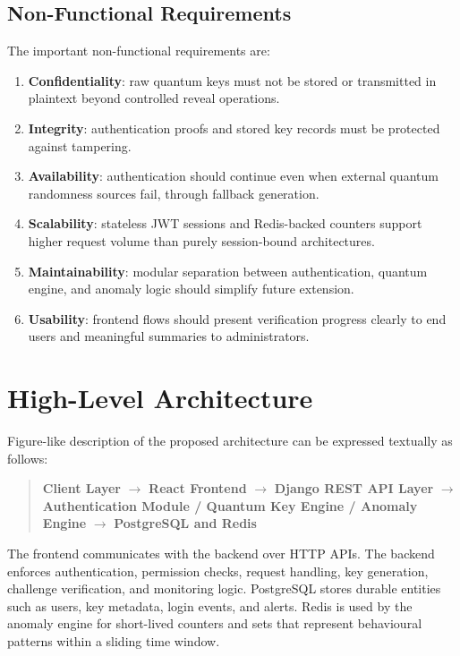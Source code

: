 \subsection{Non-Functional Requirements}
The important non-functional requirements are:

\begin{enumerate}
    \item \textbf{Confidentiality}: raw quantum keys must not be stored or transmitted in plaintext beyond controlled reveal operations.
    \item \textbf{Integrity}: authentication proofs and stored key records must be protected against tampering.
    \item \textbf{Availability}: authentication should continue even when external quantum randomness sources fail, through fallback generation.
    \item \textbf{Scalability}: stateless JWT sessions and Redis-backed counters support higher request volume than purely session-bound architectures.
    \item \textbf{Maintainability}: modular separation between authentication, quantum engine, and anomaly logic should simplify future extension.
    \item \textbf{Usability}: frontend flows should present verification progress clearly to end users and meaningful summaries to administrators.
\end{enumerate}

\section{High-Level Architecture}
Figure-like description of the proposed architecture can be expressed textually as follows:

\begin{quote}
\textbf{Client Layer} $\rightarrow$ \textbf{React Frontend} $\rightarrow$ \textbf{Django REST API Layer} $\rightarrow$ \textbf{Authentication Module / Quantum Key Engine / Anomaly Engine} $\rightarrow$ \textbf{PostgreSQL and Redis}
\end{quote}

The frontend communicates with the backend over HTTP APIs. The backend enforces authentication, permission checks, request handling, key generation, challenge verification, and monitoring logic. PostgreSQL stores durable entities such as users, key metadata, login events, and alerts. Redis is used by the anomaly engine for short-lived counters and sets that represent behavioural patterns within a sliding time window.

